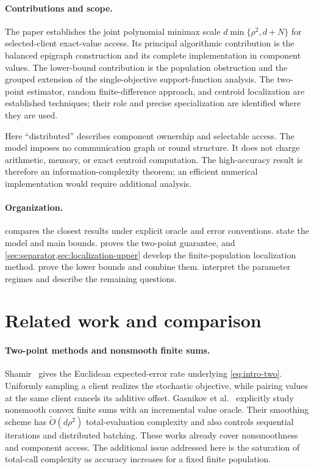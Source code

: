 \documentclass[11pt]{article}
\numberwithin{equation}{section}
\theoremstyle{remark}
\theoremstyle{definition}
\begin{document}
\paragraph{Contributions and scope.}
The paper establishes the joint polynomial minimax scale
$d\min\{\rho^2,d+N\}$ for selected-client exact-value access.
Its principal algorithmic contribution is the balanced epigraph
construction and its complete implementation in component values.
The lower-bound contribution is the population obstruction and the
grouped extension of the single-objective support-function analysis.
The two-point estimator, random finite-difference approach, and centroid
localization are established techniques; their role and precise
specialization are identified where they are used.

Here ``distributed'' describes component ownership and selectable
access. The model imposes no communication graph or round structure.
It does not charge arithmetic, memory, or exact centroid computation.
The high-accuracy result is therefore an information-complexity theorem;
an efficient numerical implementation would require additional analysis.

\paragraph{Organization.}
 compares the closest results under explicit oracle
and error conventions.  state the model and
main bounds.  proves the two-point guarantee,
and \cref{sec:separator,sec:localization-upper} develop the
finite-population localization method.
 prove the lower bounds and combine them.
 interpret the parameter regimes and
describe the remaining questions.

\section{Related work and comparison}
\label{sec:related}

\paragraph{Two-point methods and nonsmooth finite sums.}
Shamir~\cite[Corollary 2]{shamir2017} gives the Euclidean expected-error
rate underlying \eqref{eq:intro-two}. Uniformly sampling a client
realizes the stochastic objective, while pairing values at the same
client cancels its additive offset. Gasnikov
et al.~\cite[Theorem 2.4 and Section 3.2]{gasnikov2022} explicitly study
nonsmooth convex finite sums with an incremental value oracle. Their
smoothing scheme has $\widetilde O(d\rho^2)$ total-evaluation complexity
and also controls sequential iterations and distributed batching.
These works already cover nonsmoothness and component access. The
additional issue addressed here is the saturation of total-call
complexity as accuracy increases for a fixed finite population.
\end{document}
